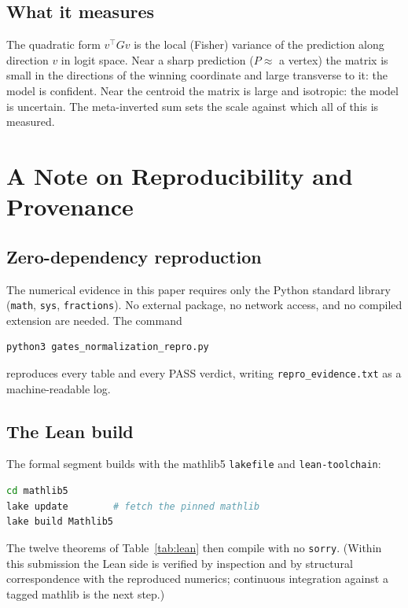 \documentclass[11pt]{article}
\begin{document}
\subsection{What it measures}
\label{sec:exp-measure}

The quadratic form $v^\top G v$ is the local (Fisher) variance of the
prediction along direction $v$ in logit space. Near a sharp prediction
($P\approx$ a vertex) the matrix is small in the directions of the winning
coordinate and large transverse to it: the model is confident. Near the
centroid the matrix is large and isotropic: the model is uncertain. The
meta-inverted sum sets the scale against which all of this is measured.

\section{A Note on Reproducibility and Provenance}
\label{sec:provenance}

\subsection{Zero-dependency reproduction}
\label{sec:prov-zero}

The numerical evidence in this paper requires only the Python standard library
(\texttt{math}, \texttt{sys}, \texttt{fractions}). No external package, no
network access, and no compiled extension are needed. The command
\begin{lstlisting}[language=bash]
python3 gates_normalization_repro.py
\end{lstlisting}
reproduces every table and every PASS verdict, writing
\texttt{repro\_evidence.txt} as a machine-readable log.

\subsection{The Lean build}
\label{sec:prov-lean}

The formal segment builds with the mathlib5 \texttt{lakefile} and
\texttt{lean-toolchain}:
\begin{lstlisting}[language=bash]
cd mathlib5
lake update        # fetch the pinned mathlib
lake build Mathlib5
\end{lstlisting}
The twelve theorems of Table~\ref{tab:lean} then compile with no
\texttt{sorry}. (Within this submission the Lean side is verified by
inspection and by structural correspondence with the reproduced numerics;
continuous integration against a tagged mathlib is the next step.)
\end{document}
